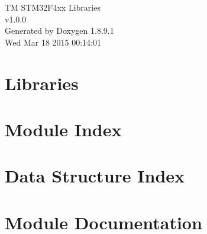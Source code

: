 \documentclass[twoside]{article}
\newcommand{\+}{\discretionary{\mbox{\scriptsize$\hookleftarrow$}}{}{}}
\begin{document}
\hypersetup{pageanchor=false,
             bookmarks=true,
             bookmarksnumbered=true,
             pdfencoding=unicode
            }
\begin{titlepage}
\vspace*{7cm}
\begin{center}%
{\Large T\+M S\+T\+M32\+F4xx Libraries \\[1ex]\large v1.\+0.\+0 }\\
\vspace*{1cm}
{\large Generated by Doxygen 1.8.9.1}\\
\vspace*{0.5cm}
{\small Wed Mar 18 2015 00:14:01}\\
\end{center}
\end{titlepage}
\tableofcontents
{}
\hypersetup{pageanchor=true}

\section{Libraries}
\label{md__r_e_a_d_m_e}
\hypertarget{md__r_e_a_d_m_e}{}

\section{Module Index}

\section{Data Structure Index}

\section{Module Documentation}
































\end{document}
